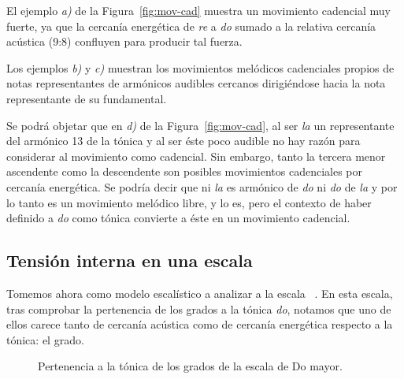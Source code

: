\documentclass[a4paper,10pt]{article}
\begin{document}
\begin{multicols}{2}
  El ejemplo \emph{a)} de la Figura~\ref{fig:mov-cad} muestra un movimiento cadencial muy fuerte, ya que la cercanía energética de \emph{re} a \emph{do} sumado a la relativa cercanía acústica (9:8) confluyen para producir tal fuerza.

  Los ejemplos \emph{b)} y \emph{c)} muestran los movimientos melódicos cadenciales propios de notas representantes de armónicos audibles cercanos dirigiéndose hacia la nota representante de su fundamental.

  Se podrá objetar que en \emph{d)} de la Figura~\ref{fig:mov-cad}, al ser \emph{la} un representante del armónico 13 de la tónica y al ser éste poco audible no hay razón para considerar al movimiento  como cadencial. Sin embargo, tanto la tercera menor ascendente como la descendente son posibles movimientos cadenciales por cercanía energética. Se podría decir que ni \emph{la} es armónico de \emph{do} ni \emph{do} de \emph{la} y por lo tanto es un movimiento melódico libre, y lo es, pero el contexto de haber definido a \emph{do} como tónica convierte a éste en un movimiento cadencial.

    \subsection{Tensión interna en una escala}\label{subsec:tension}

    Tomemos ahora como modelo escalístico a analizar a la escala \hbox{ .} En esta escala, tras comprobar la pertenencia de los grados a la tónica \emph{do}, notamos que uno de ellos carece tanto de cercanía acústica como de cercanía energética respecto a la tónica: el  grado.
\end{multicols}

\begin{figure}[ht]
\centering
{}
\caption{Pertenencia a la tónica de los grados de la escala de Do mayor. }\label{fig:pertenencia-do}
\end{figure}
\end{document}
